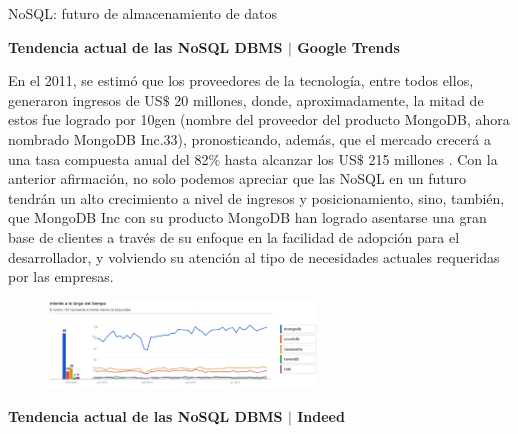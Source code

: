 \documentclass[12pt]{article}
\begin{document}
\begin{multicols}{2}
{\fontsize{9pt}{10.8pt}\selectfont NoSQL: futuro de almacenamiento de datos\par}\par


\vspace{\baselineskip}
{\fontsize{9pt}{10.8pt}\selectfont \textbf{Tendencia actual de las NoSQL DBMS $ \vert $  Google Trends}\par}\par

{\fontsize{9pt}{10.8pt}\selectfont En el 2011, se estimó que los proveedores de la tecnología, entre todos ellos, generaron ingresos de US$\$$  20 millones, donde, aproximadamente, la mitad de estos fue logrado por 10gen (nombre del proveedor del producto MongoDB, ahora nombrado MongoDB Inc.33), pronosticando, además, que el mercado crecerá a una tasa compuesta anual del 82$\%$  hasta alcanzar los US$\$$  215 millones . Con la anterior afirmación, no solo podemos apreciar que las NoSQL en un futuro tendrán un alto crecimiento a nivel de ingresos y posicionamiento, sino, también, que MongoDB Inc con su producto MongoDB han logrado asentarse una gran base de clientes a través de su enfoque en la facilidad de adopción para el desarrollador, y volviendo su atención al tipo de necesidades actuales requeridas por las empresas.\par}\par


\vspace{\baselineskip}



\begin{figure}[H]
	\begin{Center}
		\includegraphics[width=2.81in,height=0.91in]{./media/image8.png}
	\end{Center}
\end{figure}



\par


\vspace{\baselineskip}
{\fontsize{9pt}{10.8pt}\selectfont \textbf{Tendencia actual de las NoSQL DBMS $ \vert $  Indeed}\par}\par



\end{multicols}
\end{document}
